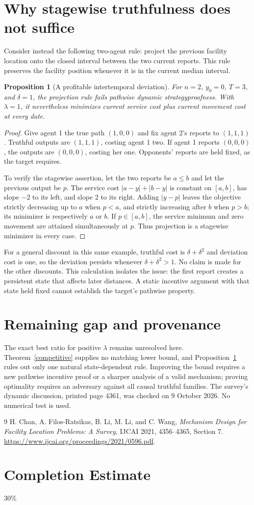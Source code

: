 \documentclass[11pt]{article}
\newtheorem{proposition}[theorem]{Proposition}
\theoremstyle{definition}
\begin{document}
\section{Why stagewise truthfulness does not suffice}
Consider instead the following two-agent rule: project the previous
facility location onto the closed interval between the two current
reports. This rule preserves the facility position whenever it is in
the current median interval.
\begin{proposition}[A profitable intertemporal deviation]\label{counter}
For $n=2$, $y_0=0$, $T=3$, and $\delta=1$, the projection rule fails
pathwise dynamic strategyproofness. With $\lambda=1$, it nevertheless
minimizes current service cost plus current movement cost at every date.
\end{proposition}
\begin{proof}
Give agent 1 the true path $(1,0,0)$ and fix agent 2's reports to
$(1,1,1)$. Truthful outputs are $(1,1,1)$, costing agent 1 two.
If agent 1 reports $(0,0,0)$, the outputs are $(0,0,0)$, costing her one.
Opponents' reports are held fixed, as the target requires.

To verify the stagewise assertion, let the two reports be $a\le b$ and
let the previous output be $p$. The service cost $|a-y|+|b-y|$ is constant
on $[a,b]$, has slope $-2$ to its left, and slope $2$ to its right.
Adding $|y-p|$ leaves the objective strictly decreasing up to $a$ when
$p<a$, and strictly increasing after $b$ when $p>b$; its minimizer is
respectively $a$ or $b$. If $p\in[a,b]$, the service minimum and zero
movement are attained simultaneously at $p$. Thus projection is a
stagewise minimizer in every case.
\end{proof}
For a general discount in this same example, truthful cost is
$\delta+\delta^2$ and deviation cost is one, so the deviation persists
whenever $\delta+\delta^2>1$. No claim is made for the other discounts.
This calculation isolates the issue: the first report creates a persistent
state that affects later distances. A static incentive argument with that
state held fixed cannot establish the target's pathwise property.

\section{Remaining gap and provenance}
The exact best ratio for positive $\lambda$ remains unresolved here.
Theorem~\ref{competitive} supplies no matching lower bound, and
Proposition~\ref{counter} rules out only one natural state-dependent rule.
Improving the bound requires a new pathwise incentive proof or a sharper
analysis of a valid mechanism; proving optimality requires an adversary
against all causal truthful families. The survey's dynamic discussion,
printed page 4361, was checked on 9 October 2026. No numerical test is used.
\begin{thebibliography}{9}
 H. Chan, A. Filos-Ratsikas, B. Li, M. Li, and C. Wang,
\emph{Mechanism Design for Facility Location Problems: A Survey},
IJCAI 2021, 4356--4365, Section 7.
\url{https://www.ijcai.org/proceedings/2021/0596.pdf}.
\end{thebibliography}

\section{Completion Estimate}
30\%
\end{document}
